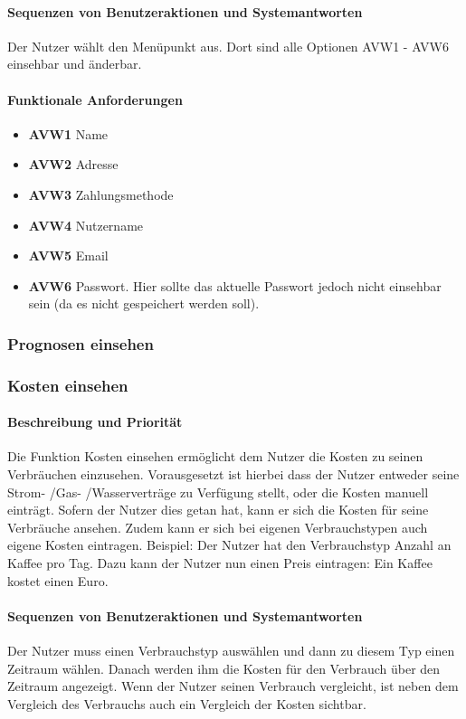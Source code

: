 \paragraph{Sequenzen von Benutzeraktionen und Systemantworten}
Der Nutzer wählt den Menüpunkt  aus. Dort sind alle Optionen AVW1 - AVW6 einsehbar und änderbar.  

\paragraph{Funktionale Anforderungen}
\begin{itemize}
	\item \textbf{AVW1} Name
	\item \textbf{AVW2} Adresse
	\item \textbf{AVW3} Zahlungsmethode
	\item \textbf{AVW4} Nutzername
	\item \textbf{AVW5} Email
	\item \textbf{AVW6} Passwort. Hier sollte das aktuelle Passwort jedoch nicht einsehbar sein (da es nicht gespeichert werden soll).
\end{itemize}
\subsubsection{Prognosen einsehen}

\subsubsection{Kosten einsehen}
\paragraph{Beschreibung und Priorität}
Die Funktion Kosten einsehen ermöglicht dem Nutzer die Kosten zu seinen Verbräuchen einzusehen. Vorausgesetzt ist hierbei dass der Nutzer entweder seine Strom- /Gas- /Wasserverträge zu Verfügung stellt, oder die Kosten manuell einträgt. Sofern der Nutzer dies getan hat, kann er sich die Kosten für seine Verbräuche ansehen. Zudem kann er sich bei eigenen Verbrauchstypen auch eigene Kosten eintragen. Beispiel: Der Nutzer hat den Verbrauchstyp Anzahl an Kaffee pro Tag. Dazu kann der Nutzer nun einen Preis eintragen: Ein Kaffee kostet einen Euro. 
\paragraph{Sequenzen von Benutzeraktionen und Systemantworten}
Der Nutzer muss einen Verbrauchstyp auswählen und dann zu diesem Typ einen Zeitraum wählen. Danach werden ihm die Kosten für den Verbrauch über den Zeitraum angezeigt. Wenn der Nutzer seinen Verbrauch vergleicht, ist neben dem Vergleich des Verbrauchs auch ein Vergleich der Kosten sichtbar. 

